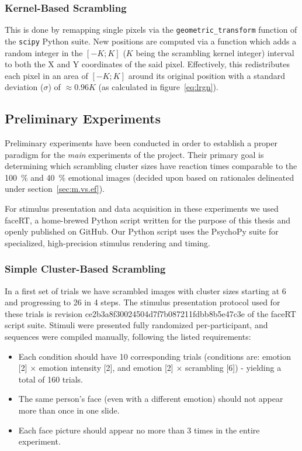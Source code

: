 	    \subsubsection{Kernel-Based Scrambling}\label{sec:m.vs.si.kbs}
	    This is done by remapping single pixels via the \colorbox{vlg}{\texttt{geometric\_transform}} function of the \colorbox{vlg}{\texttt{scipy}} Python suite. 
	    New positions are computed via a function which adds a random integer in the $[-K;K]$ ($K$ being the scrambling kernel integer) interval to both the X and Y coordinates of the said pixel.
	    Effectively, this redistributes each pixel in an area of $[-K;K]$ around its original position with a standard deviation ($\sigma$) of $\approx 0.96K$ (as calculated in figure~\ref{eq:lrgn}). 
	\subsection{Preliminary Experiments} 
	Preliminary experiments have been conducted in order to establish a proper paradigm for the \textit{main} experiments of the project. 
	Their primary goal is determining which scrambling cluster sizes have reaction times comparable to the \SI{100}{\percent} and \SI{40}{\percent} emotional images (decided upon based on rationales delineated under section~\ref{sec:m.vs.ef}).
	
	For stimulus presentation and data acquisition in these experiments we used faceRT\cite{faceRT}, a home-brewed Python script written for the purpose of this thesis and openly published on GitHub.
	Our Python script uses the PsychoPy suite\cite{Peirce2008} for specialized, high-precision stimulus rendering and timing.   
	    \subsubsection{Simple Cluster-Based Scrambling}
	    In a first set of trials we have scrambled images with cluster sizes starting at \SI{6}{\pixel} and progressing to \SI{26}{\pixel} in \SI{4}{\pixel} steps.
	    The stimulus presentation protocol used for these trials is revision \textcolor{lg}{ce2b3a8f30024504d7f7b087211fdbb8b5e47c3e} of the faceRT\cite{faceRT} script suite.
	    Stimuli were presented fully randomized per-participant, and sequences were compiled manually, following the listed requirements:
	    \begin{itemize}
		\item Each condition should have 10 corresponding trials (conditions are: emotion [2] $\times$ emotion intensity [2], and emotion [2] $\times$ scrambling [6]) - yielding a total of 160 trials.
		\item The same person's face (even with a different emotion) should not appear more than once in one slide.
		\item Each face picture should appear no more than 3 times in the entire experiment.
	    \end{itemize}
